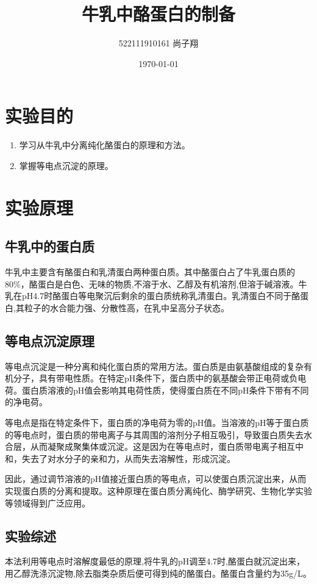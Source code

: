 \documentclass[UTF8]{ctexart}
\title{牛乳中酪蛋白的制备}
\author{522111910161 尚子翔}
\date{\today}
\begin{document}
\fancyhead[L]{}
\fancyfoot[C]{\thepage}

\maketitle
\tableofcontents
\newpage

\section{实验目的}
\begin{enumerate}
    \item 学习从牛乳中分离纯化酪蛋白的原理和方法。
    \item 掌握等电点沉淀的原理。
\end{enumerate}



\section{实验原理}
\subsection{牛乳中的蛋白质} 
    牛乳中主要含有酪蛋白和乳清蛋白两种蛋白质。其中酪蛋白占了牛乳蛋白质的80\%，酪蛋白是白色、无味的物质,不溶于水、乙醇及有机溶剂,但溶于碱溶液。牛乳在pH4.7时酪蛋白等电聚沉后剩余的蛋白质统称乳清蛋白。乳清蛋白不同于酪蛋白,其粒子的水合能力强、分散性高，在乳中呈高分子状态。
\subsection{等电点沉淀原理}
    等电点沉淀是一种分离和纯化蛋白质的常用方法。蛋白质是由氨基酸组成的复杂有机分子，具有带电性质。在特定pH条件下，蛋白质中的氨基酸会带正电荷或负电荷。蛋白质溶液的pH值会影响其电荷性质，使得蛋白质在不同pH条件下带有不同的净电荷。

等电点是指在特定条件下，蛋白质的净电荷为零的pH值。当溶液的pH等于蛋白质的等电点时，蛋白质的带电离子与其周围的溶剂分子相互吸引，导致蛋白质失去水合层，从而凝聚成聚集体或沉淀。这是因为在等电点时，蛋白质带电离子相互中和，失去了对水分子的亲和力，从而失去溶解性，形成沉淀。

因此，通过调节溶液的pH值接近蛋白质的等电点，可以使蛋白质沉淀出来，从而实现蛋白质的分离和提取。这种原理在蛋白质分离纯化、酶学研究、生物化学实验等领域得到广泛应用。

\subsection{实验综述}
本法利用等电点时溶解度最低的原理,将牛乳的pH调至4.7时,酪蛋白就沉淀出来，用乙醇洗涤沉淀物,除去脂类杂质后便可得到纯的酪蛋白。酪蛋白含量约为35g/L。
\end{document}

